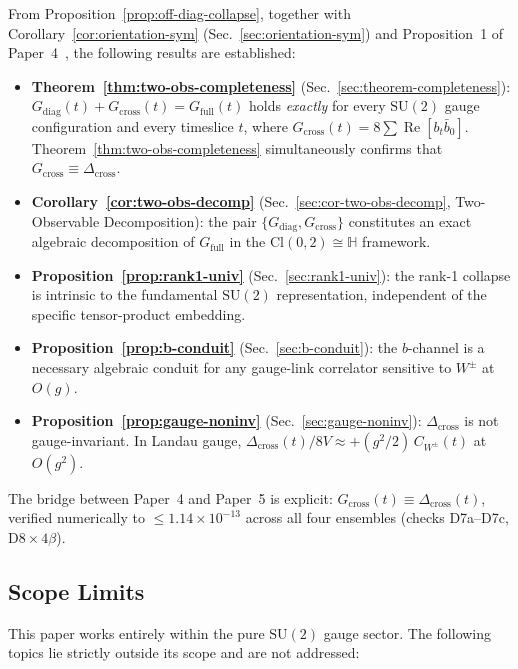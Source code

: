 \documentclass[12pt]{article}
\numberwithin{equation}{section}
\theoremstyle{plain}
\theoremstyle{definition}
\theoremstyle{remark}
\newcommand{\cl}{\mathrm{Cl}}              %
\newcommand{\su}{\mathrm{SU}}              %
\newcommand{\HH}{\mathbb{H}}               %
\newcommand{\Gdiag}{G_{\mathrm{diag}}}     %
\newcommand{\Gcross}{G_{\mathrm{cross}}}   %
\newcommand{\Gfull}{G_{\mathrm{full}}}     %
\newcommand{\Dcross}{\Delta_{\mathrm{cross}}}  %
\begin{document}
	\medskip
	From Proposition~\ref{prop:off-diag-collapse}, together with
	Corollary~\ref{cor:orientation-sym}
	(Sec.~\ref{sec:orientation-sym}) and Proposition~1 of
	Paper~4~\cite{FirestoneP4}, the following results are established:
	
	\begin{itemize}
		\item
		\textbf{Theorem~\ref{thm:two-obs-completeness}}
		(Sec.~\ref{sec:theorem-completeness}):
		$\Gdiag(t) + \Gcross(t) = \Gfull(t)$ holds \emph{exactly} for
		every $\su(2)$ gauge configuration and every timeslice $t$,
		where $\Gcross(t) = 8\sum\operatorname{Re}[b_t \bar{b}_0]$.
		Theorem~\ref{thm:two-obs-completeness} simultaneously confirms
		that $\Gcross \equiv \Dcross$.
		
		\item
		\textbf{Corollary~\ref{cor:two-obs-decomp}}
		(Sec.~\ref{sec:cor-two-obs-decomp}, Two-Observable Decomposition):
		the pair $\{\Gdiag,\Gcross\}$ constitutes an exact algebraic
		decomposition of $\Gfull$ in the $\cl(0,2)\cong\HH$ framework.
		
		\item
		\textbf{Proposition~\ref{prop:rank1-univ}}
		(Sec.~\ref{sec:rank1-univ}): the rank-1 collapse is intrinsic to
		the fundamental $\su(2)$ representation, independent of the
		specific tensor-product embedding.
		
		\item
		\textbf{Proposition~\ref{prop:b-conduit}}
		(Sec.~\ref{sec:b-conduit}): the $b$-channel is a necessary
		algebraic conduit for any gauge-link correlator sensitive to
		$W^{\pm}$ at $O(g)$.
		
		\item
		\textbf{Proposition~\ref{prop:gauge-noninv}}
		(Sec.~\ref{sec:gauge-noninv}): $\Dcross$ is not gauge-invariant.
		In Landau gauge,
		$\Dcross(t)/8V \approx +(g^2/2)\,C_{W^{\pm}}(t)$ at $O(g^2)$.
	\end{itemize}
	
	The bridge between Paper~4 and Paper~5 is explicit:
	$\Gcross(t) \equiv \Dcross(t)$, verified numerically to
	$\leq 1.14\times 10^{-13}$ across all four ensembles
	(checks D7a--D7c, D8\,$\times\,4\beta$).
	
	\subsection{Scope Limits}
	\label{sec:intro-scope}
	
	This paper works entirely within the pure $\su(2)$ gauge sector.
	The following topics lie strictly outside its scope and are not
	addressed:
	
\end{document}
